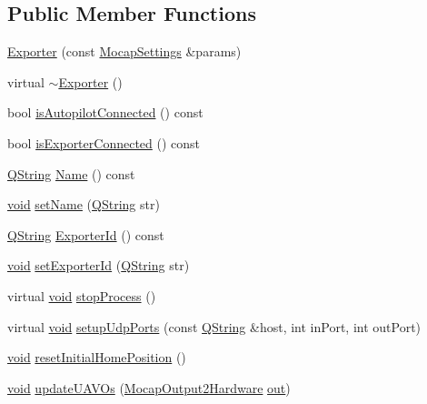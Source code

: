\subsection*{\-Public \-Member \-Functions}
\begin{DoxyCompactItemize}
\item 
\hyperlink{group___mo_cap_plugin_ga3c11abedc19c26ed0e0212e152f10685}{\-Exporter} (const \hyperlink{group___mo_cap_plugin_ga6083347a5b3eb70e360f599354dc0f0b}{\-Mocap\-Settings} \&params)
\item 
virtual \hyperlink{group___mo_cap_plugin_ga44f24686958e01a543fd8b68b392658a}{$\sim$\-Exporter} ()
\item 
bool \hyperlink{group___mo_cap_plugin_gaec7e0cea763639d6f79c4f61e9e78375}{is\-Autopilot\-Connected} () const 
\item 
bool \hyperlink{group___mo_cap_plugin_gad9cd5c117dc3025d1ef55ba560b9e7c4}{is\-Exporter\-Connected} () const 
\item 
\hyperlink{group___u_a_v_objects_plugin_gab9d252f49c333c94a72f97ce3105a32d}{\-Q\-String} \hyperlink{group___mo_cap_plugin_gaad282295f6b9ba8910db1a11c56d1998}{\-Name} () const 
\item 
\hyperlink{group___u_a_v_objects_plugin_ga444cf2ff3f0ecbe028adce838d373f5c}{void} \hyperlink{group___mo_cap_plugin_ga09d765021a9a03276d14769f3ab7c43d}{set\-Name} (\hyperlink{group___u_a_v_objects_plugin_gab9d252f49c333c94a72f97ce3105a32d}{\-Q\-String} str)
\item 
\hyperlink{group___u_a_v_objects_plugin_gab9d252f49c333c94a72f97ce3105a32d}{\-Q\-String} \hyperlink{group___mo_cap_plugin_gaebb24e563941debf0abc1897ef3c89e3}{\-Exporter\-Id} () const 
\item 
\hyperlink{group___u_a_v_objects_plugin_ga444cf2ff3f0ecbe028adce838d373f5c}{void} \hyperlink{group___mo_cap_plugin_gaf8c44fde7b72a5f5658d47408b806b62}{set\-Exporter\-Id} (\hyperlink{group___u_a_v_objects_plugin_gab9d252f49c333c94a72f97ce3105a32d}{\-Q\-String} str)
\item 
virtual \hyperlink{group___u_a_v_objects_plugin_ga444cf2ff3f0ecbe028adce838d373f5c}{void} \hyperlink{group___mo_cap_plugin_gad00fa0512ade28ce7c6e08f2e4254b59}{stop\-Process} ()
\item 
virtual \hyperlink{group___u_a_v_objects_plugin_ga444cf2ff3f0ecbe028adce838d373f5c}{void} \hyperlink{group___mo_cap_plugin_ga8790a68ca0c9e28691948cb19eba005d}{setup\-Udp\-Ports} (const \hyperlink{group___u_a_v_objects_plugin_gab9d252f49c333c94a72f97ce3105a32d}{\-Q\-String} \&host, int in\-Port, int out\-Port)
\item 
\hyperlink{group___u_a_v_objects_plugin_ga444cf2ff3f0ecbe028adce838d373f5c}{void} \hyperlink{group___mo_cap_plugin_ga4bed3f9d105ae145815a651f02083ea0}{reset\-Initial\-Home\-Position} ()
\item 
\hyperlink{group___u_a_v_objects_plugin_ga444cf2ff3f0ecbe028adce838d373f5c}{void} \hyperlink{group___mo_cap_plugin_ga6ac428e6d5db8fba507314cc56783821}{update\-U\-A\-V\-Os} (\hyperlink{struct_mocap_output2_hardware}{\-Mocap\-Output2\-Hardware} \hyperlink{uavobjecttemplate_8m_a2a89187d8e8e8fba509ef9ab5f815d88}{out})
\end{DoxyCompactItemize}
